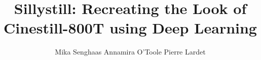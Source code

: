 \documentclass[runningheads]{llncs}
\begin{document}


\title{
    Sillystill: Recreating the Look of Cinestill-800T using Deep Learning
}

\author{Mika Senghaas \quad Annamira O'Toole \quad Pierre Lardet}


\maketitle
\thispagestyle{empty}







 






\newpage




\end{document}
